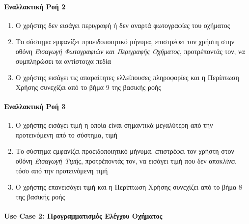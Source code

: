 \documentclass{../ol-softwaremanual}
\begin{document}
	\paragraph{Εναλλακτική Ροή 2}
	
	\begin{enumerate}
		\item Ο χρήστης δεν εισάγει περιγραφή ή δεν αναρτά φωτογραφίες του οχήματος
		\item Το σύστημα εμφανίζει προειδοποιητικό μήνυμα, επιστρέφει τον χρήστη στην οθόνη \textit{Εισαγωγή Φωτογραφιών και Περιγραφής Οχήματος}, προτρέποντάς τον, να συμπληρώσει τα αντίστοιχα πεδία
		\item Ο χρήστης εισάγει τις απαραίτητες ελλείπουσες πληροφορίες και η Περίπτωση Χρήσης συνεχίζει από το βήμα 9 της βασικής ροής
	\end{enumerate}
	
	\paragraph{Εναλλακτική Ροή 3}
	
	\begin{enumerate}
		\item Ο χρήστης εισάγει τιμή η οποία είναι σημαντικά μεγαλύτερη από την προτεινόμενη από το σύστημα, τιμή
		\item Το σύστημα εμφανίζει προειδοποιητικό μήνυμα, επιστρέφει τον χρήστη στον οθόνη \textit{Εισαγωγή Τιμής}, προτρέποντάς τον, να εισάγει τιμή που δεν αποκλίνει τόσο από την προτεινόμενη τιμή
		\item Ο χρήστης επανεισάγει τιμή και η Περίπτωση Χρήσης συνεχίζει από το βήμα 8 της βασικής ροής
	\end{enumerate}
	
	
	\paragraph{\en Use Case 2: \gr Προγραμματισμός Ελέγχου Οχήματος}
	
\end{document}
